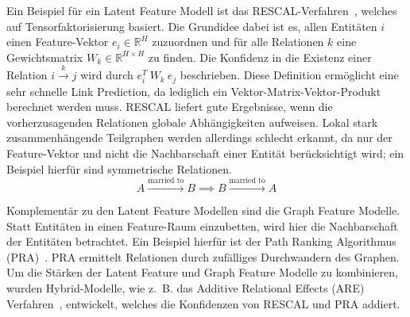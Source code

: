 \documentclass[11pt, a4paper]{scrreprt}
\begin{document}
Ein Beispiel für ein Latent Feature Modell ist das RESCAL-Verfahren~\cite{nickel:2013}, welches auf Tensorfaktorisierung basiert.
Die Grundidee dabei ist es, allen Entitäten \(i\) einen Feature-Vektor \(e_i \in \mathbb{R}^H\) zuzuordnen und für alle Relationen \(k\) eine Gewichtsmatrix \(W_k \in \mathbb{R}^{H \times H}\) zu finden.
Die Konfidenz in die Existenz einer Relation \(i \xrightarrow{k} j\) wird durch \(e_i^T\ W_k\ e_j\) beschrieben.
Diese Definition ermöglicht eine sehr schnelle Link Prediction, da lediglich ein Vektor-Matrix-Vektor-Produkt berechnet werden muss.
RESCAL liefert gute Ergebnisse, wenn die vorherzusagenden Relationen globale Abhängigkeiten aufweisen.
Lokal stark zusammenhängende Teilgraphen werden allerdings schlecht erkannt, da nur der Feature-Vektor und nicht die Nachbarschaft einer Entität berücksichtigt wird;
ein Beispiel hierfür sind symmetrische Relationen.
\[A \xrightarrow{\text{married to}} B \implies B \xrightarrow{\text{married to}} A\]

Komplementär zu den Latent Feature Modellen sind die Graph Feature Modelle.
Statt Entitäten in einen Feature-Raum einzubetten, wird hier die Nachbarschaft der Entitäten betrachtet.
Ein Beispiel hierfür ist der Path Ranking Algorithmus (PRA)~\cite{lao:2011}. PRA ermittelt Relationen durch zufälliges Durchwandern des Graphen.
Um die Stärken der Latent Feature und Graph Feature Modelle zu kombinieren, wurden Hybrid-Modelle, wie z.~B. das Additive Relational Effects (ARE) Verfahren~\cite{nickel:2014}, entwickelt, welches die Konfidenzen von RESCAL und PRA addiert.\\
\end{document}

